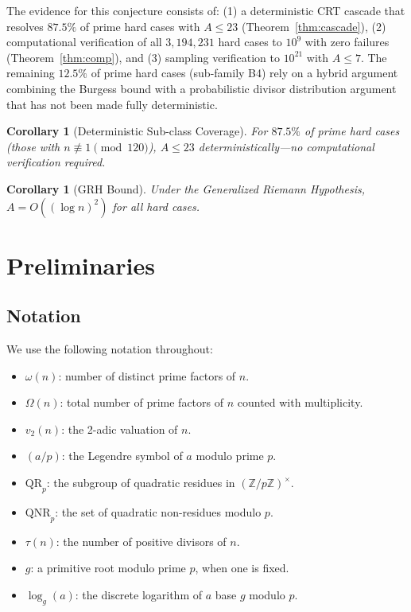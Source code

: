 \documentclass[11pt,a4paper]{article}
\theoremstyle{plain}
\newtheorem{corollary}[theorem]{Corollary}
\theoremstyle{plain}
\theoremstyle{definition}
\numberwithin{equation}{section}
\begin{document}
The evidence for this conjecture consists of: (1) a deterministic CRT cascade that resolves $87.5\%$ of prime hard cases with $A \leq 23$ (Theorem~\ref{thm:cascade}), (2) computational verification of all $3{,}194{,}231$ hard cases to $10^9$ with zero failures (Theorem~\ref{thm:comp}), and (3) sampling verification to $10^{21}$ with $A \leq 7$. The remaining $12.5\%$ of prime hard cases (sub-family B4) rely on a hybrid argument combining the Burgess bound with a probabilistic divisor distribution argument that has not been made fully deterministic.

\begin{corollary}[Deterministic Sub-class Coverage]
For $87.5\%$ of prime hard cases (those with $n \not\equiv 1 \pmod{120}$), $A \leq 23$ deterministically---no computational verification required.
\end{corollary}

\begin{corollary}[GRH Bound]
Under the Generalized Riemann Hypothesis, $A = O((\log n)^2)$ for all hard cases.
\end{corollary}

\clearpage

\section{Preliminaries}

\subsection{Notation}

We use the following notation throughout:
\begin{itemize}[noitemsep]
  \item $\omega(n)$: number of distinct prime factors of $n$.
  \item $\Omega(n)$: total number of prime factors of $n$ counted with multiplicity.
  \item $v_2(n)$: the 2-adic valuation of $n$.
  \item $(a/p)$: the Legendre symbol of $a$ modulo prime $p$.
  \item $\mathrm{QR}_p$: the subgroup of quadratic residues in $(\mathbb{Z}/p\mathbb{Z})^\times$.
  \item $\mathrm{QNR}_p$: the set of quadratic non-residues modulo $p$.
  \item $\tau(n)$: the number of positive divisors of $n$.
  \item $g$: a primitive root modulo prime $p$, when one is fixed.
  \item $\log_g(a)$: the discrete logarithm of $a$ base $g$ modulo $p$.
\end{itemize}
\end{document}
